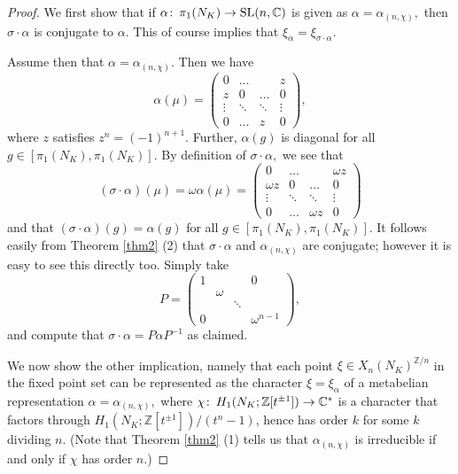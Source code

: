 \documentclass[12pt]{amsart}
\theoremstyle{plain}
\theoremstyle{remark}
\begin{document}
\begin{proof}

We first show that if ${\alpha} {\colon\thinspace} \pi_1(N_K) \to {{\rm SL}}(n,{{\mathbb C}})$ is given as ${\alpha} = {\alpha}_{(n,\chi)},$
then ${\sigma} \cdot {\alpha}$ is conjugate to ${\alpha}$. This of course implies that $\xi_{\alpha} = \xi_{{\sigma} \cdot {\alpha}}$.

Assume then that ${\alpha} = {\alpha}_{(n,\chi)}.$
Then we have $${\alpha}(\mu) =\begin{pmatrix}
0& \dots& &z \\
z& 0&\dots&0 \\
\vdots &\ddots &\ddots&\vdots \\
     0&\dots &z &0 \end{pmatrix},$$
     where $z$ satisfies $z^{n}= (-1)^{n+1}.$
Further, ${\alpha}(g)$ is diagonal for all $g\in [\pi_1(N_K), \pi_1(N_K)]$.
By definition of ${\sigma} \cdot {\alpha},$ we  see that
$$({\sigma}\cdot{\alpha}) (\mu) = {\omega} {\alpha}(\mu)=
\begin{pmatrix} 0& \dots &&{\omega} z \\
{\omega} z &0&\dots &0 \\
\vdots &\ddots &\ddots&\vdots \\
     0&\dots &{\omega} z &0 \end{pmatrix}$$
     and that $({\sigma} \cdot {\alpha})(g) = {\alpha}(g)$
     for all $g \in [\pi_1(N_K), \pi_1(N_K)]$.
It follows easily  from Theorem \ref{thm2} (2)
that ${\sigma} \cdot {\alpha}$ and ${\alpha}_{(n,\chi)}$ are conjugate;
however it is easy to see this directly too.
Simply take   $$P = \begin{pmatrix} 1&&& 0 \\
 &{\omega} \\
&&\ddots  \\
     0&&&{\omega}^{n-1} \end{pmatrix},$$
     and compute that
     ${\sigma} \cdot {\alpha} =P {\alpha} P^{-1}$ as claimed.

We now show the other implication, namely that each point
$\xi \in X_n(N_K)^{{{\mathbb Z}}/n}$ in the fixed point set
can be represented as the character $\xi=\xi_{\alpha}$
of a metabelian representation ${\alpha} = {\alpha}_{(n,\chi)},$
where $\chi {\colon\thinspace} H_1(N_K; {{\mathbb Z}}[t^{\pm 1}]) \to {{\mathbb C}}^*$
is a character that factors through $H_1(N_K; {{\mathbb Z}}[t^{\pm 1}])/(t^n-1)$,
hence has order $k$ for some $k$ dividing $n$.
(Note that Theorem \ref{thm2} (1) tells us that
${\alpha}_{(n,\chi)}$ is irreducible if and only
if $\chi$ has order $n$.)


\end{proof}
\end{document}
